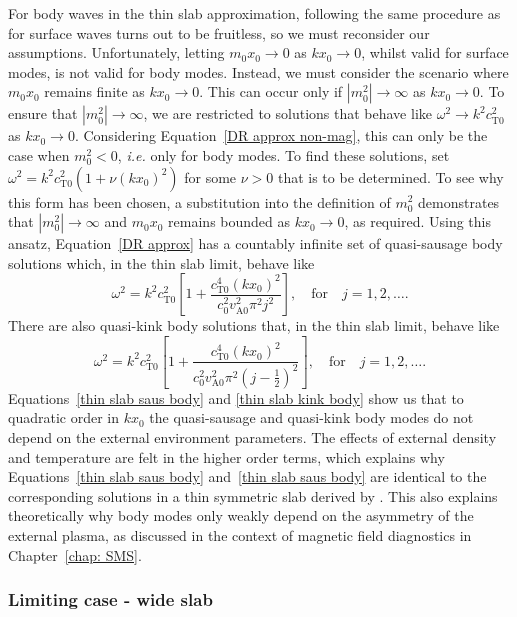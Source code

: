 \documentclass[12pt,draft]{../style-files/ociamthesis}
\begin{document}
For body waves in the thin slab approximation, following the same procedure as for surface waves turns out to be fruitless, so we must reconsider our assumptions. Unfortunately, letting $m_0x_0 \to 0$ as $kx_0 \to 0$, whilst valid for surface modes, is not valid for body modes. Instead, we must consider the scenario where $m_0x_0$ remains finite as $kx_0 \to 0$. This can occur only if $|m_0^2| \to \infty$ as $kx_0 \to 0$.  To ensure that $|m_0^2| \to \infty$, we are restricted to solutions that behave like $\omega^2 \to k^2c_\textrm{T0}^2$ as $kx_0 \to 0$. Considering Equation~\eqref{DR approx non-mag}, this can only be the case when $m_0^2 < 0$, \textit{i.e.} only for body modes. To find these solutions, set $\omega^2 = k^2c_\textrm{T0}^2(1 + \nu(kx_0)^2)$ for some $\nu > 0$ that is to be determined. To see why this form has been chosen, a substitution into the definition of $m_0^2$ demonstrates that $|m_0^2| \to \infty$ and $m_0x_0$ remains bounded as $kx_0 \to 0$, as required. Using this ansatz, Equation~\eqref{DR approx} has a countably infinite set of quasi-sausage body solutions which, in the thin slab limit, behave like
\begin{equation}
\omega^2 = k^2c_\textrm{T0}^2\left[1 + \frac{c_\textrm{T0}^4(kx_0)^2}{c_0^2v_\textrm{A0}^2\pi^2j^2}\right], \quad \text{for} \quad j = 1, 2, \ldots. \label{thin slab saus body}
\end{equation}
There are also quasi-kink body solutions that, in the thin slab limit, behave like
\begin{equation}
\omega^2 = k^2c_\textrm{T0}^2\left[1 + \frac{c_\textrm{T0}^4(kx_0)^2}{c_0^2v_\textrm{A0}^2\pi^2(j - \frac{1}{2})^2}\right], \quad \text{for} \quad j = 1, 2, \ldots. \label{thin slab kink body}
\end{equation}
Equations~\eqref{thin slab saus body} and \eqref{thin slab kink body} show us that to quadratic order in $kx_0$ the quasi-sausage and quasi-kink body modes do not depend on the external environment parameters. The effects of external density and temperature are felt in the higher order terms, which explains why Equations~\eqref{thin slab saus body} and~\eqref{thin slab saus body} are identical to the corresponding solutions in a thin symmetric slab derived by \citealt{rob81b}. This also explains theoretically why body modes only weakly depend on the asymmetry of the external plasma, as discussed in the context of magnetic field diagnostics in Chapter~\ref{chap: SMS}.


\subsubsection{Limiting case - wide slab} \label{sec: wide slab}
\end{document}
